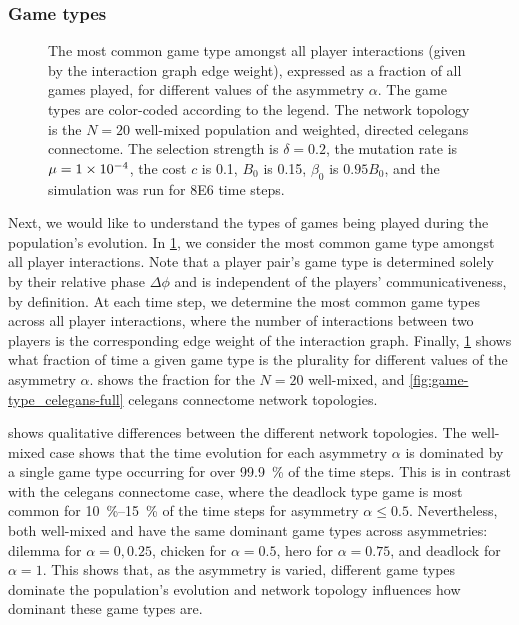 \documentclass[pdflatex,lineno,referee,sn-mathphys-ay]{sn-jnl}
\begin{document}
\subsubsection{Game types}
\begin{figure}
  \centering
  
  \caption{
    The most common game type amongst all player interactions
    (given by the interaction graph edge weight),
    expressed as a fraction of all games played,
    for different values of the asymmetry $\alpha$.
    The game types are color-coded according to the legend.
    The network topology is the
    $N=20$ well-mixed population
    and
    weighted, directed \gls{celegans} connectome.
    The selection strength is $\delta=0.2$,
    the mutation rate is $\mu=\num{1E-4}$,
    the cost $c$ is \num{0.1},
    $B_0$ is \num{0.15},
    $\beta_0$ is $\num{0.95} B_0$,
    and the simulation was run for \num{8E6} time steps.
  }
  \label{fig:game-type}
\end{figure}

Next, we would like to understand the types of games being played
during the population's evolution.
In \cref{fig:game-type}, we consider the most common game type
amongst all player interactions.
Note that a player pair's game type is determined solely
by their relative phase $\Delta \phi$ and is independent
of the players' communicativeness, by definition.
At each time step, we determine the most common game types
across all player interactions,
where the number of interactions between two players
is the corresponding edge weight of the interaction graph.
Finally, \cref{fig:game-type} shows what fraction of time
a given game type is the plurality for different values
of the asymmetry $\alpha$.
shows the fraction for the
$N=20$ well-mixed,
and
\cref{fig:game-type_celegans-full}
\gls{celegans} connectome network topologies.

 shows qualitative differences
between the different network topologies.
The  well-mixed case
shows that the time evolution for each asymmetry $\alpha$
is dominated by a single game type
occurring for over \SI{99.9}{\percent} of the time steps.
This is in contrast with the
 \gls{celegans} connectome case,
where the deadlock type game is most common
for \SIrange{10}{15}{\percent} of the time steps
for asymmetry $\alpha \le 0.5$.
Nevertheless, both  well-mixed
and  have the same dominant game types
across asymmetries:
dilemma for $\alpha = 0, 0.25$, chicken for $\alpha = 0.5$,
hero for $\alpha = 0.75$, and deadlock for $\alpha = 1$.
This shows that, as the asymmetry is varied,
different game types dominate the population's evolution
and network topology influences how dominant these game types are.
\end{document}
